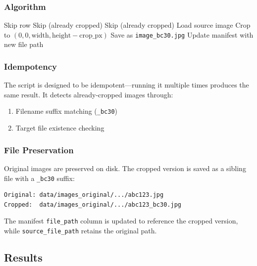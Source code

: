\documentclass[12pt,a4paper]{article}
\begin{document}
\subsubsection{Algorithm}

\begin{algorithm}[H]
	\caption{Bottom Crop Algorithm}
	\begin{algorithmic}[1]
		\State Skip row
		\EndIf
		\State Skip (already cropped)
		\EndIf
		\State Skip (already cropped)
		\EndIf
		\State Load source image
		\State Crop to $(0, 0, \text{width}, \text{height} - \text{crop\_px})$
		\State Save as \texttt{image\_bc30.jpg}
		\State Update manifest with new file path
		\EndFor
	\end{algorithmic}
\end{algorithm}

\subsubsection{Idempotency}

The script is designed to be idempotent---running it multiple times produces the same result. It detects already-cropped images through:
\begin{enumerate}
	\item Filename suffix matching (\texttt{\_bc30})
	\item Target file existence checking
\end{enumerate}

\subsubsection{File Preservation}

Original images are preserved on disk. The cropped version is saved as a sibling file with a \texttt{\_bc30} suffix:

\begin{lstlisting}[language=bash]
Original: data/images_original/.../abc123.jpg
Cropped:  data/images_original/.../abc123_bc30.jpg
\end{lstlisting}

The manifest \texttt{file\_path} column is updated to reference the cropped version, while \texttt{source\_file\_path} retains the original path.

\subsection{Results}
\end{document}
